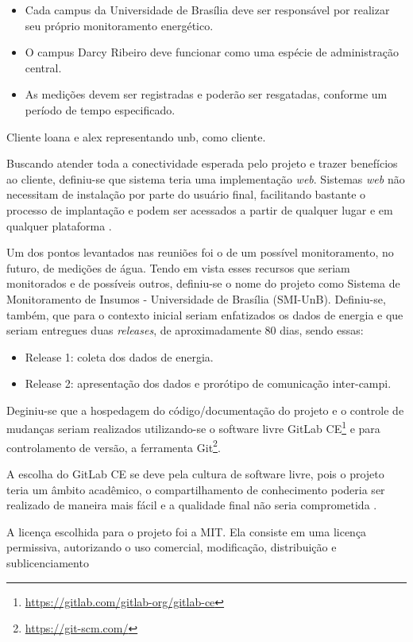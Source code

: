 \begin{itemize}
    \item Cada campus da Universidade de Brasília deve ser responsável por realizar seu próprio monitoramento energético.
    \item O campus Darcy Ribeiro deve funcionar como uma espécie de administração central.
    \item As medições devem ser registradas e poderão ser resgatadas, conforme um período de tempo especificado.
\end{itemize}

Cliente loana e alex representando unb, como cliente.

Buscando atender toda a conectividade esperada pelo projeto e trazer benefícios ao cliente, definiu-se que sistema teria uma implementação \textit{web}. Sistemas \textit{web} não necessitam de instalação por parte do usuário final, facilitando bastante o processo de implantação e podem ser acessados a partir de qualquer lugar e em qualquer plataforma \cite{pressman_2009}.

Um dos pontos levantados nas reuniões foi o de um possível monitoramento, no futuro, de medições de água. Tendo em vista esses recursos que seriam monitorados e de possíveis outros, definiu-se o nome do projeto como Sistema de Monitoramento de Insumos - Universidade de Brasília (SMI-UnB). Definiu-se, também, que para o contexto inicial seriam enfatizados os dados de energia e que seriam entregues duas \textit{releases}, de aproximadamente 80 dias, sendo essas:

\begin{itemize}
    \item Release 1: coleta dos dados de energia.
    \item Release 2: apresentação dos dados e prorótipo de comunicação inter-campi.
\end{itemize}

Deginiu-se que a hospedagem do código/documentação do projeto e o controle de mudanças seriam realizados utilizando-se o software livre GitLab CE\footnote{\url{https://gitlab.com/gitlab-org/gitlab-ce}} e para controlamento de versão, a ferramenta Git\footnote{\url{https://git-scm.com/}}.

A escolha do GitLab CE se deve pela cultura de software livre, pois o projeto teria um âmbito acadêmico, o compartilhamento de conhecimento poderia ser realizado de maneira mais fácil e a qualidade final não seria comprometida \cite{raymond1999}.

A licença escolhida para o projeto foi a MIT. Ela consiste em uma licença permissiva, autorizando o uso comercial, modificação, distribuição e sublicenciamento \cite{mit_license}

